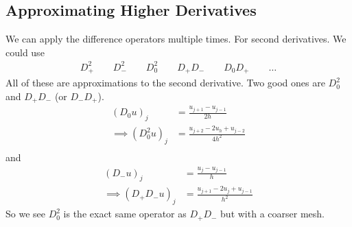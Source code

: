 \documentclass{article}
\begin{document}
        \subsection{Approximating Higher Derivatives}
            We can apply the difference operators multiple times.  For second derivatives.  We could use
            \begin{align*}
                D_+^2 \qquad D_-^2 \qquad D_0^2 \qquad D_+D_- \qquad D_0D_+ \qquad \dots
            \end{align*}
            All of these are approximations to the second derivative.  Two good ones are $D_0^2$ and $D_+D_-$ (or $D_-D_+$).
            \begin{align*}
                (D_0u)_j &= \frac{u_{j+1} - u_{j-1}}{2h} \\
                \implies (D_0^2u)_j &= \frac{u_{j+2} - 2u_h + u_{j-2}}{4h^2} \\
            \end{align*}
            and
            \begin{align*}
                (D_-u)_j &= \frac{u_j - u_{j-1}}{h} \\
                \implies (D_+D_-u)_j &= \frac{u_{j+1} - 2u_j + u_{j-1}}{h^2}
            \end{align*}
            So we see $D_0^2$ is the exact same operator as $D_+D_-$ but with a coarser mesh.
\end{document}
